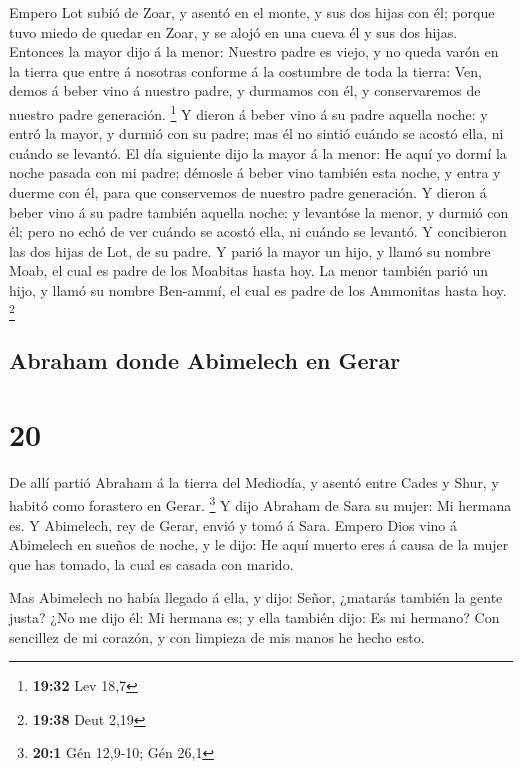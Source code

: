  Empero Lot subió de Zoar, y asentó en el monte, y sus
dos hijas con él; porque tuvo miedo de quedar en Zoar, y se alojó en una
cueva él y sus dos hijas.  Entonces la mayor dijo á la
menor: Nuestro padre es viejo, y no queda varón en la tierra que entre á
nosotras conforme á la costumbre de toda la tierra:  Ven,
demos á beber vino á nuestro padre, y durmamos con él, y conservaremos
de nuestro padre generación. \footnote{\textbf{19:32} Lev 18,7}
 Y dieron á beber vino á su padre aquella noche: y entró
la mayor, y durmió con su padre; mas él no sintió cuándo se acostó ella,
ni cuándo se levantó.  El día siguiente dijo la mayor á
la menor: He aquí yo dormí la noche pasada con mi padre; démosle á beber
vino también esta noche, y entra y duerme con él, para que conservemos
de nuestro padre generación.  Y dieron á beber vino á su
padre también aquella noche: y levantóse la menor, y durmió con él; pero
no echó de ver cuándo se acostó ella, ni cuándo se levantó.
 Y concibieron las dos hijas de Lot, de su padre.
 Y parió la mayor un hijo, y llamó su nombre Moab, el
cual es padre de los Moabitas hasta hoy.  La menor
también parió un hijo, y llamó su nombre Ben-ammí, el cual es padre de
los Ammonitas hasta hoy. \footnote{\textbf{19:38} Deut 2,19}

\hypertarget{abraham-donde-abimelech-en-gerar}{%
\subsection{Abraham donde Abimelech en
Gerar}\label{abraham-donde-abimelech-en-gerar}}

\hypertarget{section-19}{%
\section{20}\label{section-19}}

 De allí partió Abraham á la tierra del Mediodía, y asentó
entre Cades y Shur, y habitó como forastero en Gerar. \footnote{\textbf{20:1}
  Gén 12,9-10; Gén 26,1}  Y dijo Abraham de Sara su mujer:
Mi hermana es. Y Abimelech, rey de Gerar, envió y tomó á Sara.
 Empero Dios vino á Abimelech en sueños de noche, y le
dijo: He aquí muerto eres á causa de la mujer que has tomado, la cual es
casada con marido.

 Mas Abimelech no había llegado á ella, y dijo: Señor,
¿matarás también la gente justa?  ¿No me dijo él: Mi
hermana es; y ella también dijo: Es mi hermano? Con sencillez de mi
corazón, y con limpieza de mis manos he hecho esto.

